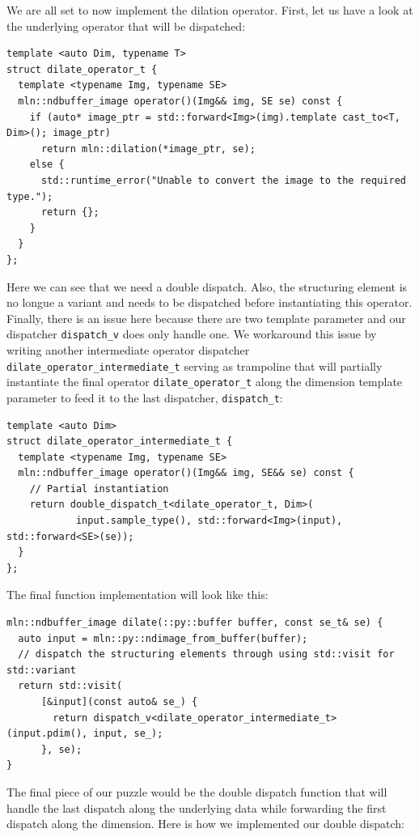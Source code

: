We are all set to now implement the dilation operator. First, let us have a look at the underlying operator that will be
dispatched:

\begin{verbatim}
template <auto Dim, typename T>
struct dilate_operator_t {
  template <typename Img, typename SE>
  mln::ndbuffer_image operator()(Img&& img, SE se) const {
    if (auto* image_ptr = std::forward<Img>(img).template cast_to<T, Dim>(); image_ptr)
      return mln::dilation(*image_ptr, se);
    else {
      std::runtime_error("Unable to convert the image to the required type.");
      return {};
    }
  }
};
\end{verbatim}

Here we can see that we need a double dispatch. Also, the structuring element is no longue a variant and needs to be
dispatched before instantiating this operator. Finally, there is an issue here because there are two template parameter
and our dispatcher \texttt{dispatch\_v} does only handle one. We workaround this issue by writing another intermediate
operator dispatcher \texttt{dilate\_operator\_intermediate\_t} serving as trampoline that will partially instantiate the
final operator \texttt{dilate\_operator\_t} along the dimension template parameter to feed it to the last dispatcher,
\texttt{dispatch\_t}:

\begin{verbatim}
template <auto Dim>
struct dilate_operator_intermediate_t {
  template <typename Img, typename SE>
  mln::ndbuffer_image operator()(Img&& img, SE&& se) const {
    // Partial instantiation
    return double_dispatch_t<dilate_operator_t, Dim>(
            input.sample_type(), std::forward<Img>(input), std::forward<SE>(se));
  }
};
\end{verbatim}

The final function implementation will look like this:

\begin{verbatim}
mln::ndbuffer_image dilate(::py::buffer buffer, const se_t& se) {
  auto input = mln::py::ndimage_from_buffer(buffer);
  // dispatch the structuring elements through using std::visit for std::variant 
  return std::visit(
      [&input](const auto& se_) {
        return dispatch_v<dilate_operator_intermediate_t>(input.pdim(), input, se_);
      }, se);
}
\end{verbatim}

The final piece of our puzzle would be the double dispatch function that will handle the last dispatch along the
underlying data while forwarding the first dispatch along the dimension. Here is how we implemented our double dispatch:

